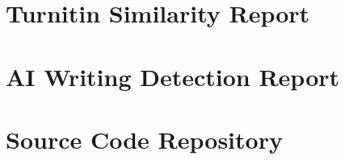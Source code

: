 \documentclass[12pt]{report}
\begin{document}

\newpage
\setcounter{page}{1}
\pagestyle{plain}
\setcounter{page}{1}
  
 




\newpage

\renewcommand*\contentsname{Table of Contents}
\tableofcontents
\newpage
{}
\listoftables

\newpage
{}
\listoffigures

\clearpage
\setcounter{page}{1}
  
 





\clearpage
{}
\nocite{*}




\clearpage
\appendix

\chapter{Turnitin Similarity Report}
\label{app:turnitin}


\chapter{AI Writing Detection Report}
\label{app:ai_report}


\chapter{Source Code Repository}
\label{app:source_code}

\end{document}
